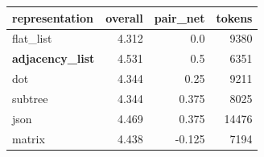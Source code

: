 \begin{tabular}{lrrr}
\toprule
representation & overall & pair\_net & tokens \\
\midrule
flat\_list & 4.312 & 0.0 & 9380 \\
\textbf{adjacency\_list} & 4.531 & 0.5 & 6351 \\
dot & 4.344 & 0.25 & 9211 \\
subtree & 4.344 & 0.375 & 8025 \\
json & 4.469 & 0.375 & 14476 \\
matrix & 4.438 & -0.125 & 7194 \\
\bottomrule
\end{tabular}
